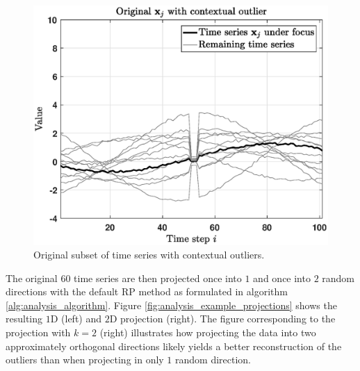 \begin{figure}[h]
	\centering
	\vspace{-0.15cm}
	\includegraphics[scale=0.35]{analysis/Analysis_deltarp_original}
	\caption{Original subset of time series with contextual outliers.}
	\label{fig:analysis_example_original}
	\vspace{-0.15cm}
\end{figure}

The original $60$ time series are then projected once into $1$ and once into $2$ random directions with the default RP method as formulated in algorithm \ref{alg:analysis_algorithm}. Figure \ref{fig:analysis_example_projections} shows the resulting $1$D (left) and $2$D projection (right). The figure corresponding to the projection with $k=2$ (right) illustrates how projecting the data into two approximately orthogonal directions likely yields a better reconstruction of the outliers than when projecting in only $1$ random direction. 

